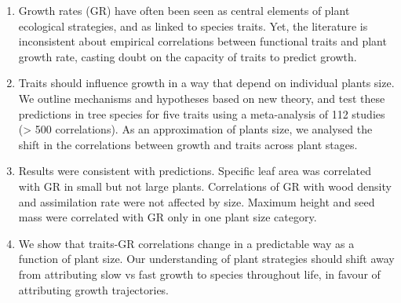 \documentclass[a4paper]{article}\usepackage[]{graphicx}\usepackage[]{color}
\begin{document}
\begin{enumerate}

\item
Growth rates (GR) have often been seen as central elements of plant ecological strategies, and as linked to species traits. Yet, the literature is inconsistent about empirical correlations between functional traits and plant growth rate, casting doubt on the capacity of traits to predict growth.

\item 
Traits should influence growth in a way that depend on individual plants size. We outline mechanisms and hypotheses based on new theory, and test these predictions in tree species for five traits using a meta-analysis of 112 studies (> 500 correlations). As an approximation of plants size, we analysed the shift in the correlations between growth and traits across plant stages.

\item
Results were consistent with predictions. Specific leaf area was correlated with GR in small but not large plants. Correlations of GR with wood density and assimilation rate were not affected by size. Maximum height and seed mass were correlated with GR only in one plant size category.

\item 
We show that traits-GR correlations change in a predictable way as a function of plant size. Our understanding of plant strategies should shift away from attributing slow vs fast growth to species throughout life, in favour of attributing growth trajectories.

 
\end{enumerate}
\end{document}

